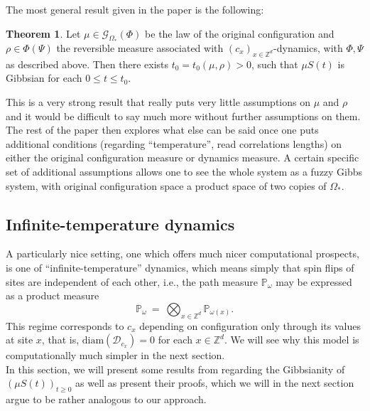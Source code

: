 \documentclass[12pt]{article}
\newcommand{\D}{\mathcal{D}}
\newcommand{\G}{\mathcal{G}}
\renewcommand{\P}{\mathbb{P}}
\newcommand{\Z}{\mathbb{Z}}
\newcommand{\1}{\mathbbm{1}}
\newcommand{\5}{\vspace{0.5cm}}
\theoremstyle{definition}
\newtheorem{thm}{Theorem}[section]
\begin{document}
The most general result given in the paper is the following:

\begin{thm}
Let $\mu\in\G_{\Omega_*}(\Phi)$ be the law of the original configuration and $\rho\in\Phi(\Psi)$ the reversible measure associated with $(c_x)_{x\in\Z^d}$-dynamics, with $\Phi,\Psi$ as described above. Then there exists $t_0=t_0(\mu,\rho)>0$, such that $\mu S(t)$ is Gibbsian for each $0\leq t\leq t_0$. 
\end{thm}

This is a very strong result that really puts very little assumptions on $\mu$ and $\rho$ and it would be difficult to say much more without further assumptions on them. The rest of the paper then explores what else can be said once one puts additional conditions (regarding ``temperature'', read correlations lengths) on either the original configuration measure or dynamics measure. A certain specific set of additional assumptions allows one to see the whole system as a fuzzy Gibbs system, with original configuration space a product space of two copies of $\Omega_*$.
 

\subsection{Infinite-temperature dynamics}

A particularly nice setting, one which offers much nicer computational prospects, is one of ``infinite-temperature'' dynamics, which means simply that spin flips of sites are independent of each other, i.e., the path measure $\P_\omega$ may be expressed as a product measure
$$\P_\omega ~=~ \bigotimes_{x\in\Z^d}\P_{\omega(x)}.$$
This regime corresponds to $c_x$ depending on configuration only through its values at site $x$, that is, $\mathrm{diam}(\D_{c_x})=0$ for each $x\in\Z^d$. We will see why this model is computationally much simpler in the next section. \\

In this section, we will present some results from \cite{EFHR} regarding the Gibbsianity of $(\mu S(t))_{t\geq 0}$ as well as present their proofs, which we will in the next section argue to be rather analogous to our approach. \\
\end{document}
